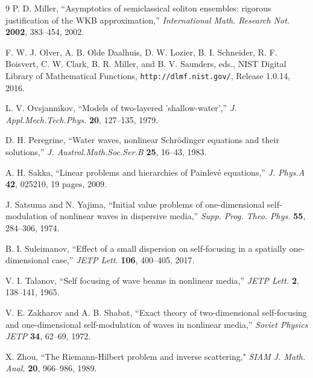 \documentclass[12pt]{amsart}
\numberwithin{equation}{section}
\begin{document}
\begin{thebibliography}{9}
P. D. Miller, ``Asymptotics of semiclassical soliton ensembles:  rigorous justification of the WKB approximation,'' \textit{International Math. Research Not.} \textbf{2002}, 383--454, 2002.

F. W. J. Olver, A. B. Olde Daalhuis, D. W. Lozier, B. I. Schneider, R. F. Boisvert, C. W. Clark, B. R. Miller, and B. V. Saunders, eds., NIST Digital Library of Mathematical Functions, \texttt{http://dlmf.nist.gov/}, Release 1.0.14,  2016. 

L. V. Ovsjannikov, ``Models of two-layered 'shallow-water','' \textit{J. Appl.\@ Mech.\@ Tech.\@ Phys.\@} \textbf{20}, 127--135, 1979.

D. H. Peregrine, ``Water waves, nonlinear Schr\"odinger equations and their solutions,'' \textit{J. Austral.\@ Math.\@ Soc.\@ Ser.\@ B} \textbf{25}, 16--43, 1983. 

A. H. Sakka, 
``Linear problems and hierarchies of Painlev\'e equations,''
\textit{J. Phys.\@ A} 
\textbf{42}, 025210, 19 pages, 2009.

J. Satsuma and N. Yajima, 
``Initial value problems of one-dimensional self-modulation of nonlinear waves 
in dispersive media,''  
\textit{Supp. Prog. Theo. Phys.}
\textbf{55}, 284--306, 1974.

B. I. Suleimanov, ``Effect of a small dispersion on self-focusing in a spatially one-dimensional case,'' \textit{JETP Lett.\@} \textbf{106}, 
400--405, 2017.

V. I. Talanov, ``Self focusing of wave beams in nonlinear media,'' \textit{JETP Lett.\@} \textbf{2}, 138--141, 1965.

V. E. Zakharov and A. B. Shabat,
``Exact theory of two-dimensional self-focusing and one-dimensional
   self-modulation of waves in nonlinear media,''
\textit{Soviet Physics JETP} 
\textbf{34}, 62--69,
1972.

X. Zhou, ``The Riemann-Hilbert problem and inverse scattering," \textit{SIAM J. Math. Anal.} 
\textbf{20}, 966--986, 1989.

\end{thebibliography}
\end{document}
